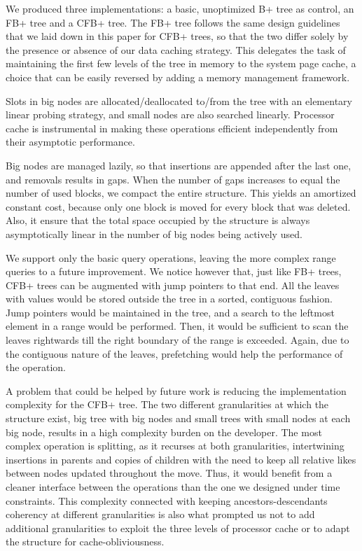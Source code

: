 \documentclass{article}
\begin{document}
We produced three implementations: a basic, unoptimized B+ tree as control, an FB+ tree and a CFB+ tree.
The FB+ tree follows the same design guidelines that we laid down in this paper for CFB+ trees,
so that the two differ solely by the presence or absence of our data caching strategy.
This delegates the task of maintaining the first few levels of the tree in memory to the system page cache,
a choice that can be easily reversed by adding a memory management framework.

Slots in big nodes are allocated/deallocated to/from the tree with an elementary linear probing strategy,
and small nodes are also searched linearly.
Processor cache is instrumental in making these operations efficient independently from their asymptotic performance.

Big nodes are managed lazily, so that insertions are appended after the last one, and removals results in gaps.
When the number of gaps increases to equal the number of used blocks, we compact the entire structure.
This yields an amortized constant cost, because only one block is moved for every block that was deleted.
Also, it ensure that the total space occupied by the structure is always asymptotically linear in the number
of big nodes being actively used.

We support only the basic query operations, leaving the more complex range queries to a future improvement.
We notice however that, just like FB+ trees, CFB+ trees can be augmented with jump pointers to that end.
All the leaves with values would be stored outside the tree in a sorted, contiguous fashion.
Jump pointers would be maintained in the tree, and a search to the leftmost element in a range would be performed.
Then, it would be sufficient to scan the leaves rightwards till the right boundary of the range is exceeded.
Again, due to the contiguous nature of the leaves, prefetching would help the performance of the operation.

A problem that could be helped by future work is reducing the implementation complexity for the CFB+ tree.
The two different granularities at which the structure exist, big tree with big nodes and small trees with small nodes
at each big node, results in a high complexity burden on the developer.
The most complex operation is splitting, as it recurses at both granularities, intertwining insertions in parents
and copies of children with the need to keep all relative likes between nodes updated throughout the move.
Thus, it would benefit from a cleaner interface between the operations than the one we designed under
time constraints. 
This complexity connected with keeping ancestors-descendants coherency at different granularities
is also what prompted us not to add additional granularities to exploit the three levels of processor cache
or to adapt the structure for cache-obliviousness.
\end{document}
